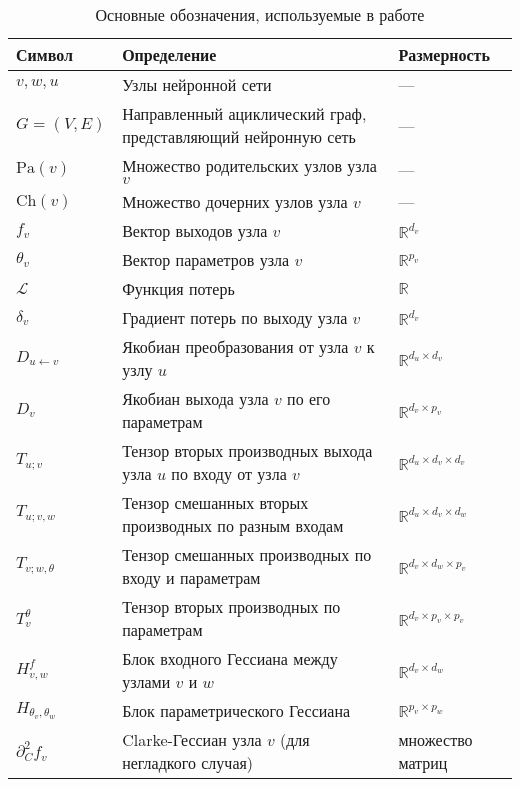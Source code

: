 \documentclass[11pt]{article}
\begin{document}
\begin{table}[h]
  \centering
  \caption{Основные обозначения, используемые в работе}
  \label{tab:notations}
  \begin{tabular}{p{2cm}p{8cm}p{3cm}}
    \toprule
    \textbf{Символ} & \textbf{Определение} & \textbf{Размерность} \\
    \midrule
    $v, w, u$ & Узлы нейронной сети & — \\
    $G = (V, E)$ & Направленный ациклический граф, представляющий нейронную сеть & — \\
    $\text{Pa}(v)$ & Множество родительских узлов узла $v$ & — \\
    $\text{Ch}(v)$ & Множество дочерних узлов узла $v$ & — \\
    $f_v$ & Вектор выходов узла $v$ & $\mathbb{R}^{d_v}$ \\
    $\theta_v$ & Вектор параметров узла $v$ & $\mathbb{R}^{p_v}$ \\
    $\mathcal{L}$ & Функция потерь & $\mathbb{R}$ \\
    $\delta_v$ & Градиент потерь по выходу узла $v$ & $\mathbb{R}^{d_v}$ \\
    $D_{u \gets v}$ & Якобиан преобразования от узла $v$ к узлу $u$ & $\mathbb{R}^{d_u \times d_v}$ \\
    $D_v$ & Якобиан выхода узла $v$ по его параметрам & $\mathbb{R}^{d_v \times p_v}$ \\
    $T_{u;v}$ & Тензор вторых производных выхода узла $u$ по входу от узла $v$ & $\mathbb{R}^{d_u \times d_v
    \times d_v}$ \\
    $T_{u;v,w}$ & Тензор смешанных вторых производных по разным входам & $\mathbb{R}^{d_u \times d_v \times d_w}$ \\
    $T_{v;w,\theta}$ & Тензор смешанных производных по входу и параметрам & $\mathbb{R}^{d_v \times d_w \times p_v}$ \\
    $T_v^{\theta}$ & Тензор вторых производных по параметрам & $\mathbb{R}^{d_v \times p_v \times p_v}$ \\
    $H^f_{v,w}$ & Блок входного Гессиана между узлами $v$ и $w$ & $\mathbb{R}^{d_v \times d_w}$ \\
    $H_{\theta_v,\theta_w}$ & Блок параметрического Гессиана & $\mathbb{R}^{p_v \times p_w}$ \\
    $\partial_C^2 f_v$ & Clarke-Гессиан узла $v$ (для негладкого случая) & множество матриц \\
    \bottomrule
  \end{tabular}
\end{table}
\end{document}
